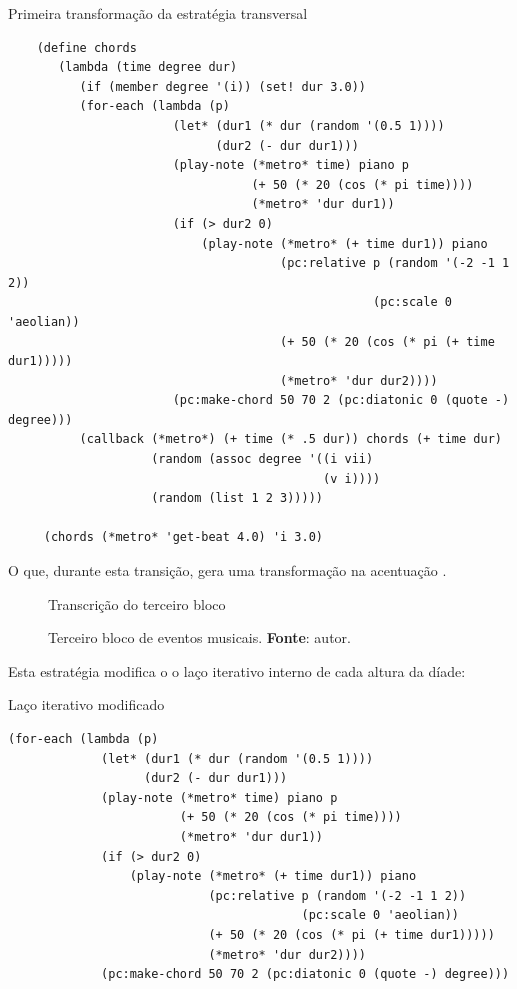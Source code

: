 \begin{example}{Primeira transformação da estratégia transversal}
\begin{verbatim}
    (define chords
       (lambda (time degree dur)
          (if (member degree '(i)) (set! dur 3.0))
          (for-each (lambda (p)
                       (let* (dur1 (* dur (random '(0.5 1))))
                             (dur2 (- dur dur1)))
                       (play-note (*metro* time) piano p
                                  (+ 50 (* 20 (cos (* pi time))))
                                  (*metro* 'dur dur1))
                       (if (> dur2 0)
                           (play-note (*metro* (+ time dur1)) piano
                                      (pc:relative p (random '(-2 -1 1 2))
                                                   (pc:scale 0 'aeolian))
                                      (+ 50 (* 20 (cos (* pi (+ time dur1)))))
                                      (*metro* 'dur dur2))))
                       (pc:make-chord 50 70 2 (pc:diatonic 0 (quote -) degree)))
          (callback (*metro*) (+ time (* .5 dur)) chords (+ time dur)
                    (random (assoc degree '((i vii)
                                            (v i))))
                    (random (list 1 2 3)))))
    
     (chords (*metro* 'get-beat 4.0) 'i 3.0)
\end{verbatim}
\end{example}

O que, durante esta transição, gera uma transformação na acentuação .

\begin{figure}{Transcrição do terceiro bloco}
  \centering
  
  \caption{Terceiro bloco de eventos musicais. \textbf{Fonte}: autor.}
  \label{fig:ask4}
\end{figure}

Esta estratégia modifica o o laço iterativo interno de cada altura da díade:

\begin{example}{Laço iterativo modificado}
\begin{verbatim}
(for-each (lambda (p)
             (let* (dur1 (* dur (random '(0.5 1))))
                   (dur2 (- dur dur1)))
             (play-note (*metro* time) piano p
                        (+ 50 (* 20 (cos (* pi time))))
                        (*metro* 'dur dur1))
             (if (> dur2 0)
                 (play-note (*metro* (+ time dur1)) piano
                            (pc:relative p (random '(-2 -1 1 2))
                                         (pc:scale 0 'aeolian))
                            (+ 50 (* 20 (cos (* pi (+ time dur1)))))
                            (*metro* 'dur dur2))))
             (pc:make-chord 50 70 2 (pc:diatonic 0 (quote -) degree)))
\end{verbatim}
\end{example}


